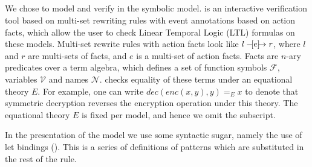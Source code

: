  

\subsection{\mTamarin{}}
\label{sec:tamarin}
 
We chose \mTamarin{} to model and verify \mEdhoc{} in the symbolic model.
%
\mTamarin{} is an interactive verification tool based on multi-set rewriting rules
with event annotations based on action facts, which allow the user to check
 Linear Temporal Logic (LTL) formulas on these models.
%
Multi-set rewrite rules with action facts look like $ l \ifarrow[e] r $,
where $l$ and $r$ are multi-sets of facts, and $e$ is a multi-set of action facts.
Facts are $n$-ary predicates over a term algebra, which defines a set of function
symbols $\mathcal F$, variables $\mathcal V$ and names $\mathcal N$. \mTamarin{}
checks equality of these terms under an equational theory $E$. For example,
one can write $ dec(enc(x,y),y) =_E x $
to denote that symmetric decryption reverses the encryption operation under this theory.
The equational theory $E$ is fixed per model, and hence we omit the subscript.

In the presentation of the model we use some syntactic
sugar, namely
the use of let bindings (). This is a series of
definitions of patterns which are substituted in the rest of the rule. \\

%

